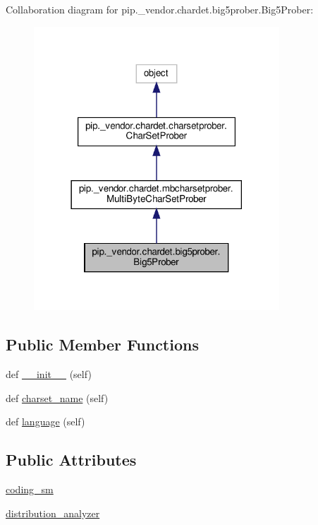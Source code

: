 Collaboration diagram for pip.\+\_\+vendor.\+chardet.\+big5prober.\+Big5\+Prober\+:
\nopagebreak
\begin{figure}[H]
\begin{center}
\leavevmode
\includegraphics[width=261pt]{classpip_1_1__vendor_1_1chardet_1_1big5prober_1_1Big5Prober__coll__graph}
\end{center}
\end{figure}
\subsection*{Public Member Functions}
\begin{DoxyCompactItemize}
\item 
def \hyperlink{classpip_1_1__vendor_1_1chardet_1_1big5prober_1_1Big5Prober_a485d74a22b6c501add60f4b02636dd76}{\+\_\+\+\_\+init\+\_\+\+\_\+} (self)
\item 
def \hyperlink{classpip_1_1__vendor_1_1chardet_1_1big5prober_1_1Big5Prober_a4876862fa57d57ba42ce3fdc978d678c}{charset\+\_\+name} (self)
\item 
def \hyperlink{classpip_1_1__vendor_1_1chardet_1_1big5prober_1_1Big5Prober_afd9d15354d56e820245fa4567abfae51}{language} (self)
\end{DoxyCompactItemize}
\subsection*{Public Attributes}
\begin{DoxyCompactItemize}
\item 
\hyperlink{classpip_1_1__vendor_1_1chardet_1_1big5prober_1_1Big5Prober_aa396023a42e0e822aca33008a97b9128}{coding\+\_\+sm}
\item 
\hyperlink{classpip_1_1__vendor_1_1chardet_1_1big5prober_1_1Big5Prober_a286e3d18b1ac9de345d5f9aef51f8155}{distribution\+\_\+analyzer}
\end{DoxyCompactItemize}
